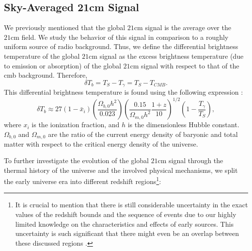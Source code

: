 \documentclass[12pt, TexShade, letterpaper]{report}
\begin{document}
\subsection{Sky-Averaged 21cm Signal}
\label{chap:global21cm,sub:physics,sub:global}
We previously mentioned that the global $\mathrm{21cm}$ signal is the average over the $\mathrm{21cm}$ field. We study the behavior of this signal in comparison to a roughly uniform source of radio background. Thus, we define the differential brightness temperature of the global $\mathrm{21cm}$ signal as the excess brightness temperature (due to emission or absorption) of the global $\mathrm{21cm}$ signal with respect to that of the \gls{cmb} background. Therefore,
\begin{equation}
    \delta T_b = T_{S} - T_{\gamma} = T_S - T_{CMB}.
\end{equation}
This differential brightness temperature is found using the following expression \cite{low_frequency}:
\begin{equation}
    \delta T_b \approx 27 \left(1- \bar{x}_i\right) \left(\frac{\Omega_{b, 0}h^2}{0.023}\right) \left( \frac{0.15}{\Omega_{m, 0}h^2} \frac{1+z}{10}\right)^{1/2}\left(1-\frac{T_\gamma}{T_S}\right),
    \label{eq:global_curve}
\end{equation}
where $x_i$ is the ionization fraction, and $h$ is the dimensionless Hubble constant. $\Omega_{b, 0}$ and $\Omega_{m, 0}$ are the ratio of the current energy density of baryonic and total matter with respect to the critical energy density of the universe.\par
To further investigate the evolution of the global $\mathrm{21cm}$ signal through the thermal history of the universe and the involved physical mechanisms, we split the early universe era into different redshift regions\footnote{It is crucial to mention that there is still considerable uncertainty in the exact values of the redshift bounds and the sequence of events due to our highly limited knowledge on the characteristics and effects of early sources. This uncertainty is such significant that there might even be an overlap between these discussed regions \cite{21century}.}:\par
\end{document}
